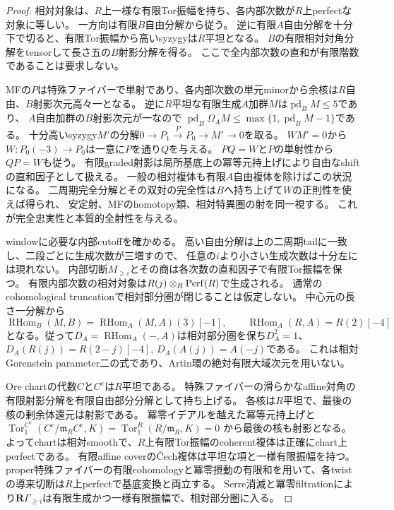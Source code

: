 \begin{proof}
相対対象は、$R$上一様な有限Tor振幅を持ち、各内部次数が$R$上perfectな対象に等しい。
一方向は有限$B$自由分解から従う。
逆に有限$A$自由分解を十分下で切ると、有限Tor振幅から高いsyzygyは$R$平坦となる。
$B$の有限相対対角分解をtensorして長さ五の$B$射影分解を得る。
ここで全内部次数の直和が有限階数であることは要求しない。

MFの$P$は特殊ファイバーで単射であり、各内部次数の単元minorから余核は$R$自由、$B$射影次元高々一となる。
逆に$R$平坦な有限生成$A$加群$M$は$\operatorname{pd}_BM\le5$であり、
$A$自由加群の$B$射影次元が一なので
$\operatorname{pd}_B\Omega_AM\le\max\{1,\operatorname{pd}_BM-1\}$である。
十分高いsyzygy$M'$の分解$0\to P_1\xrightarrow P P_0\to M'\to0$を取る。
$WM'=0$から$W:P_0(-3)\to P_0$は一意に$P$を通り$Q$を与える。
$PQ=W$と$P$の単射性から$QP=W$も従う。
有限graded射影は局所基底上の冪等元持上げにより自由なshiftの直和因子として扱える。
一般の相対複体も有限$A$自由複体を除けばこの状況になる。
二周期完全分解とその双対の完全性は$B$へ持ち上げて$W$の正則性を使えば得られ、
安定射、MFのhomotopy類、相対特異圏の射を同一視する。
これが完全忠実性と本質的全射性を与える。

windowに必要な内部cutoffを確かめる。
高い自由分解は上の二周期tailに一致し、二段ごとに生成次数が三増すので、
任意の$i$より小さい生成次数は十分左には現れない。
内部切断$M_{\ge i}$とその商は各次数の直和因子で有限Tor振幅を保つ。
有限内部次数の相対対象は$R(j)\otimes_R\operatorname{Perf}(R)$で生成される。
通常のcohomological truncationで相対部分圏が閉じることは仮定しない。
中心元の長さ一分解から
\[
 \operatorname{RHom}_B(M,B)=\operatorname{RHom}_A(M,A)(3)[-1],\qquad
 \operatorname{RHom}_A(R,A)=R(2)[-4]
\]
となる。従って$D_A=\operatorname{RHom}_A(-,A)$は相対部分圏を保ち$D_A^2=1$、
$D_A(R(j))=R(2-j)[-4]$, $D_A(A(j))=A(-j)$である。
これは相対Gorenstein parameter二の式であり、Artin環の絶対有限大域次元を用いない。

Ore chartの代数$C$と$C^e$は$R$平坦である。
特殊ファイバーの滑らかなaffine対角の有限射影分解を有限自由部分分解として持ち上げる。
各核は$R$平坦で、最後の核の剰余体還元は射影である。
冪零イデアルを越えた冪等元持上げと
$\operatorname{Tor}^{C^e}_1(C^e/\mathfrak{m}_RC^e,K)
=\operatorname{Tor}^R_1(R/\mathfrak{m}_R,K)=0$
から最後の核も射影となる。
よってchartは相対smoothで、$R$上有限Tor振幅のcoherent複体は正確にchart上perfectである。
有限affine coverのČech複体は平坦な項と一様有限振幅を持つ。
proper特殊ファイバーの有限cohomologyと冪零摂動の有限和を用いて、各twistの導来切断は$R$上perfectで基底変換と両立する。
Serre消滅と冪零filtrationにより$\mathbf R\Gamma_{\ge i}$は有限生成かつ一様有限振幅で、相対部分圏に入る。


\end{proof}
